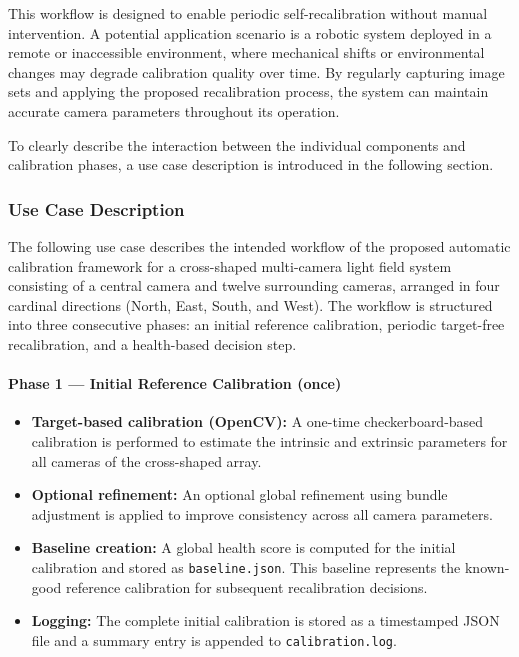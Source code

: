 \documentclass[12pt]{scrartcl}
\begin{document}
This workflow is designed to enable periodic self-recalibration without manual intervention. A potential application scenario is a robotic system deployed in a remote or inaccessible environment, where mechanical shifts or environmental changes may degrade calibration quality over time. By regularly capturing image sets and applying the proposed recalibration process, the system can maintain accurate camera parameters throughout its operation.
\newline

To clearly describe the interaction between the individual components and calibration phases, a use case description is introduced in the following section.

\subsubsection{Use Case Description}

The following use case describes the intended workflow of the proposed automatic calibration framework for a cross-shaped multi-camera light field system consisting of a central camera and twelve surrounding cameras, arranged in four cardinal directions (North, East, South, and West). The workflow is structured into three consecutive phases: an initial reference calibration, periodic target-free recalibration, and a health-based decision step.

\vspace{0.3cm}

\paragraph{Phase 1 — Initial Reference Calibration (once)}
\begin{itemize}
  \item \textbf{Target-based calibration (OpenCV):}
  A one-time checkerboard-based calibration is performed to estimate the intrinsic
  and extrinsic parameters for all cameras of the cross-shaped array.

  \item \textbf{Optional refinement:}
  An optional global refinement using bundle adjustment is applied to improve
  consistency across all camera parameters.

  \item \textbf{Baseline creation:}
  A global health score is computed for the initial calibration and stored as
  \texttt{baseline.json}. This baseline represents the known-good reference
  calibration for subsequent recalibration decisions.

  \item \textbf{Logging:}
  The complete initial calibration is stored as a timestamped JSON file and a
  summary entry is appended to \texttt{calibration.log}.
\end{itemize}
\end{document}
